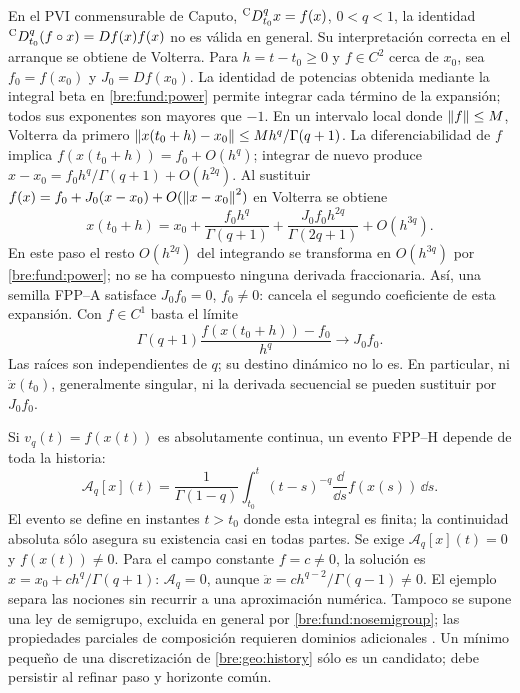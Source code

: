 En el PVI conmensurable de Caputo, ${}^{\mathrm C}D_{t_0}^{q}x=f(x)$, $0<q<1$, la
identidad ${}^{\mathrm C}D_{t_0}^{q}(f\circ x)=Df(x)f(x)$ no es válida en general. Su
interpretación correcta en el arranque se obtiene de Volterra. Para
$h=t-t_0\ge0$ y $f\in C^2$ cerca de $x_0$, sea $f_0=f(x_0)$ y
$J_0=Df(x_0)$. La identidad de potencias obtenida mediante la integral
beta en \eqref{bre:fund:power} permite integrar cada término de la
expansión; todos sus exponentes son mayores que $-1$.
En un intervalo local donde $\left\lVert f\right\rVert\le M$, Volterra da primero
$\left\lVert x(t_0+h)-x_0\right\rVert\le Mh^q/\Gamma(q+1)$.
La diferenciabilidad de $f$ implica $f(x(t_0+h))=f_0+O(h^q)$;
integrar de nuevo produce
$x-x_0=f_0h^q/\Gamma(q+1)+O(h^{2q})$. Al sustituir
$f(x)=f_0+J_0(x-x_0)+O(\left\lVert x-x_0\right\rVert^2)$ en Volterra se obtiene
\begin{equation}
 x(t_0+h)=x_0+\frac{f_0h^q}{\Gamma(q+1)}
 +\frac{J_0f_0h^{2q}}{\Gamma(2q+1)}+O(h^{3q}).
 \label{bre:geo:picard}
\end{equation}
En este paso el resto $O(h^{2q})$ del integrando se transforma en
$O(h^{3q})$ por \eqref{bre:fund:power}; no se ha compuesto ninguna
derivada fraccionaria. Así, una semilla FPP--A satisface $J_0f_0=0$, $f_0\ne0$: cancela el
segundo coeficiente de esta expansión. Con $f\in C^1$ basta el límite
\begin{equation}
 \Gamma(q+1)\frac{f(x(t_0+h))-f_0}{h^q}\longrightarrow J_0f_0.
 \label{bre:geo:startup}
\end{equation}
Las raíces son independientes de $q$; su destino dinámico no lo es.
En particular, ni $\ddot x(t_0)$, generalmente singular, ni la derivada
secuencial se pueden sustituir por $J_0f_0$.

Si $v_q(t)=f(x(t))$ es absolutamente continua, un evento FPP--H depende
de toda la historia:
\begin{equation}
 \mathcal A_q[x](t)=\frac1{\Gamma(1-q)}
 \int_{t_0}^t(t-s)^{-q}\frac{\dd}{\dd s}f(x(s))\,\dd s.
 \label{bre:geo:history}
\end{equation}
El evento se define en instantes $t>t_0$ donde esta integral es finita;
la continuidad absoluta sólo asegura su existencia casi en todas partes.
Se exige $\mathcal A_q[x](t)=0$ y $f(x(t))\ne0$. Para el campo constante
$f=c\ne0$, la solución es $x=x_0+ch^q/\Gamma(q+1)$:
$\mathcal A_q=0$, aunque $\ddot x=ch^{q-2}/\Gamma(q-1)\ne0$.
El ejemplo separa las nociones sin recurrir a una aproximación numérica.
Tampoco se supone una ley de semigrupo, excluida en general por
\eqref{bre:fund:nosemigroup}; las propiedades parciales de composición
requieren dominios adicionales \cite{Cong2023Semigroup}.
Un mínimo pequeño de una discretización de \eqref{bre:geo:history} sólo
es un candidato; debe persistir al refinar paso y horizonte común.

